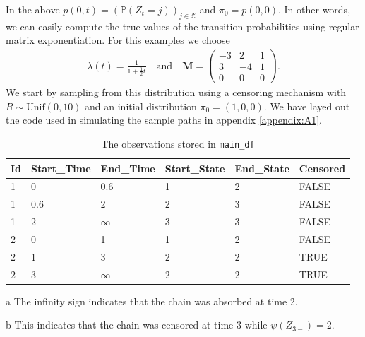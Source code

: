 \documentclass[12pt,letter,twoside]{article}
\theoremstyle{plain}
\theoremstyle{definition}
\theoremstyle{remark}
\newcounter{example}
\begin{document}
In the above $p(0,t)=(\mathbb P(Z_t=j))_{j\in\mathcal Z}$ and $\pi_0=p(0,0)$. In other words, we can easily compute the true values of the transition probabilities using regular matrix exponentiation. For this examples we choose
\begin{align}
    \lambda(t)=\frac{1}{1+\frac{1}{2}t} \quad\text{and}\quad \mathbf M=
    \begin{pmatrix}
        -3 & 2 & 1\\
        3 & - 4 & 1\\
        0 & 0 & 0
    \end{pmatrix}.
\end{align}
We start by sampling from this distribution using a censoring mechanism with $R\sim \text{Unif}(0,10)$ and an initial distribution $\pi_0=(1,0,0)$. We have layed out the code used in simulating the sample paths in appendix \ref{appendix:A1}.

\begin{table}[hbt!]\label{tbl:1}
\begin{center}
\begin{threeparttable}
\caption{The observations stored in \texttt{main\_df}}
\label{table_example}
\begin{tabular}{llllll}
\toprule
Id & Start\_Time & End\_Time & Start\_State & End\_State & Censored\\
\midrule
1 & 0 & 0.6 & 1 & 2 & FALSE\\
1 & 0.6 & 2 & 2 & 3 & FALSE\\
1 & 2 & $\infty$\tnote{a} & 3 & 3 & FALSE\\
\midrule
2 & 0 & 1 & 1 & 2 & FALSE\\
2 & 1 & 3 & 2 & 2 & TRUE\tnote{b}\\
2 & 3 & $\infty$ & 2 & 2 & TRUE\tnote{b}\\
\bottomrule
\end{tabular}
\begin{tablenotes}[hang] %
\item[a]The infinity sign indicates that the chain was absorbed at time 2.
\item[b]This indicates that the chain was censored at time 3 while $\psi(Z_{3-})=2$.
\end{tablenotes}
\end{threeparttable}
\end{center}
\end{table}
\end{document}

